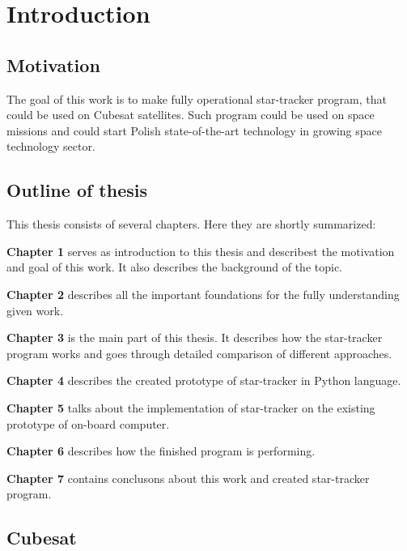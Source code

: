 \documentclass[12pt,a4paper,oneside]{article}
\begin{document}
\newpage
\cite{jenssen2011comparison}
\cite{valenti2015keeping}
\cite{delabie2012highly}
\cite{jalabert2011optimization}
\cite{felikson2011orbit}
\cite{knutson2012fast}
\cite{rose2003star}
\cite{mortari2002starnav}


\section{Introduction}
\subsection{Motivation}
The goal of this work is to make fully operational star-tracker program, that could be used on Cubesat satellites. Such program could be used on space missions and could start Polish state-of-the-art technology in growing space technology sector.

\subsection{Outline of thesis}



This thesis consists of several chapters. Here they are shortly summarized:\par
\setlength{\parindent}{0cm}
\textbf{Chapter 1} serves as introduction to this thesis and describest the motivation and goal of this work. It also describes the background of the topic.\par
\textbf{Chapter 2} describes all the important foundations for the fully understanding given work.\par
\textbf{Chapter 3} is the main part of this thesis. It describes how the star-tracker program works and goes through detailed comparison of different approaches.\par
\textbf{Chapter 4} describes the created prototype of star-tracker in Python language.\par
\textbf{Chapter 5} talks about the implementation of star-tracker on the existing prototype of on-board computer.\par
\textbf{Chapter 6} describes how the finished program is performing.\par
\textbf{Chapter 7} contains conclusons about this work and created star-tracker program.\par

\setlength{\parindent}{1cm}

\subsection{Cubesat}
\end{document}
